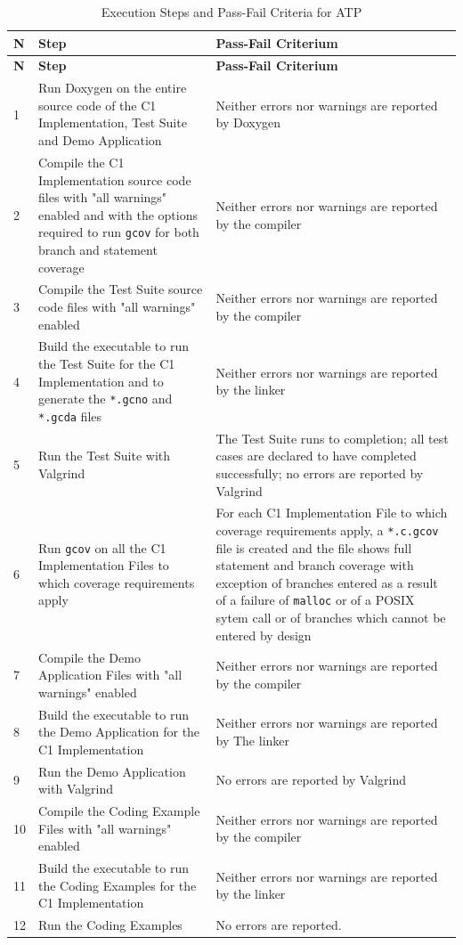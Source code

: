 \documentclass[a4paper,10pt]{article}
\begin{document}
\begin{longtable}{|l|p{5.2cm}|p{5.2cm}|}
\caption{Execution Steps and Pass-Fail Criteria for ATP}\label{tab:atp} \\
\hline
\rowcolor{gray}
\textbf{N} & \textbf{Step} & \textbf{Pass-Fail Criterium} \\
\hline\hline
\endfirsthead
\rowcolor{gray}
\textbf{N} & \textbf{Step} & \textbf{Pass-Fail Criterium} \\
\hline\hline
\endhead

1 & Run Doxygen on the entire source code of the C1 Implementation, Test Suite and Demo Application &
Neither errors nor warnings are reported by Doxygen \\
\hline
2 & Compile the C1 Implementation source code files with "all warnings" enabled and with the options required to run \texttt{gcov} for both branch and statement coverage &
Neither errors nor warnings are reported by the compiler \\
\hline
3 & Compile the Test Suite source code files with "all warnings" enabled &
Neither errors nor warnings are reported by the compiler \\
\hline
4 & Build the executable to run the Test Suite for the C1 Implementation and to generate the \texttt{*.gcno} and \texttt{*.gcda} files &
Neither errors nor warnings are reported by the linker \\
\hline
5 & Run the Test Suite with Valgrind &
The Test Suite runs to completion; all test cases are declared to have completed successfully; no errors are reported by Valgrind \\
\hline
6 & Run \texttt{gcov} on all the C1 Implementation Files to which coverage requirements apply &
For each C1 Implementation File to which coverage requirements apply, a \texttt{*.c.gcov}
file is created and the file shows full statement and branch coverage with exception of
branches entered as a result of a failure of \texttt{malloc} or of a POSIX sytem call or of branches which cannot be entered by design \\
\hline
7 & Compile the Demo Application Files with "all warnings" enabled &
Neither errors nor warnings are reported by the compiler \\
\hline
8 & Build the executable to run the Demo Application for the C1 Implementation &
Neither errors nor warnings are reported by The linker \\
\hline
9 & Run the Demo Application with Valgrind &
No errors are reported by Valgrind \\
10 & Compile the Coding Example Files with "all warnings" enabled &
Neither errors nor warnings are reported by the compiler \\
\hline
11 & Build the executable to run the Coding Examples for the C1 Implementation &
Neither errors nor warnings are reported by the linker \\
\hline
12 & Run the Coding Examples &
No errors are reported. \\
\hline
\end{longtable}
\end{document}
